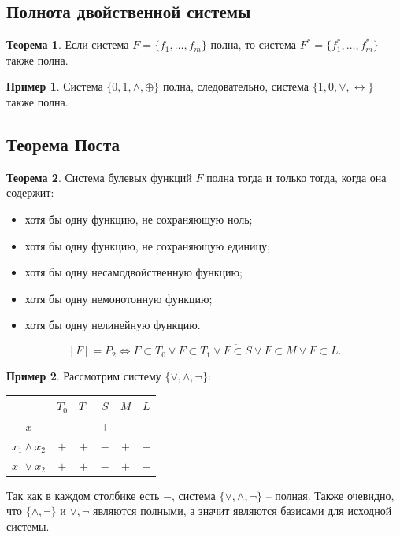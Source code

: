 \documentclass[a5paper, 11pt]{extarticle}
\theoremstyle{definition}
\newtheorem*{theorem*}{Теорема}
\newtheorem{example}{Пример}[subsection]
\theoremstyle{definition}
\theoremstyle{definition}
\numberwithin{figure}{section}
\numberwithin{table}{section}
\begin{document}
\subsection{Полнота двойственной системы}

\begin{theorem*}
    Если система \(F = \{f_1, \ldots, f_m\}\) полна, то система \(F^* = \{f_1^*, \ldots, f_m^*\}\) также полна.
\end{theorem*}

\begin{example}
    Система \(\{0, 1, \land, \oplus\}\) полна, следовательно, система \(\{1, 0, \lor, \leftrightarrow\}\) также полна.
\end{example}

\subsection{Теорема Поста}

\begin{theorem*}
    Система булевых функций \(F\) полна тогда и только тогда, когда она содержит:
    \begin{itemize}
        \item хотя бы одну функцию, не сохраняющую ноль;
        \item хотя бы одну функцию, не сохраняющую единицу;
        \item хотя бы одну несамодвойственную функцию;
        \item хотя бы одну немонотонную функцию;
        \item хотя бы одну нелинейную функцию.
    \end{itemize}

    \[
        [F] = P_2
        \iff
        \overline{F \subset T_0 \lor F \subset T_1 \lor F \subset S \lor F \subset M \lor F \subset L}.
    \]
\end{theorem*}

\begin{example}
    Рассмотрим систему \(\{\lor, \land, \neg\}\):
    {
    \renewcommand*{\arraystretch}{1.5}
    \begin{longtable}{|c|c|c|c|c|c|}
        \hline
                          & \(T_0\) & \(T_1\) & \(S\) & \(M\) & \(L\) \\
        \hline
        \(\bar{x}\)       & \(-\)   & \(-\)   & \(+\) & \(-\) & \(+\) \\
        \hline
        \(x_1 \land x_2\) & \(+\)   & \(+\)   & \(-\) & \(+\) & \(-\) \\
        \hline
        \(x_1 \lor x_2\)  & \(+\)   & \(+\)   & \(-\) & \(+\) & \(-\) \\
        \hline
    \end{longtable}
    }
    Так как в каждом столбике есть \(-\), система \(\{\lor, \land, \neg\}\) -- полная. Также очевидно, что \(\{\land, \neg\}\) и \(\lor, \neg\) являются полными, а значит являются базисами для исходной системы.
\end{example}
\end{document}
